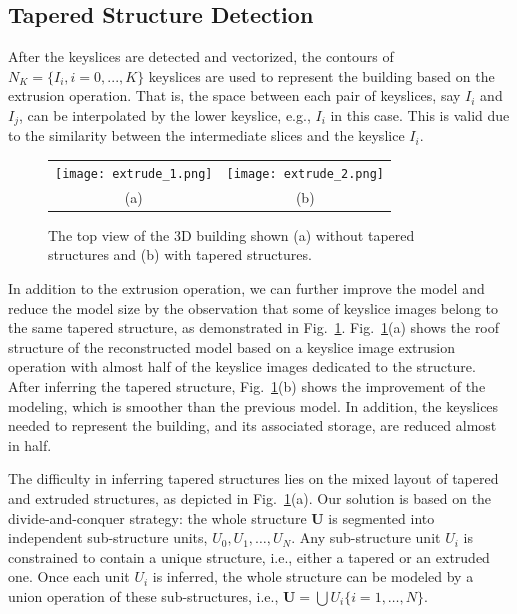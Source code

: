 \documentclass{article}
\newcommand{\Fig}[1]{Fig.~\ref{fig:#1}}
\newcommand{\Figa}[1]{Fig.~\ref{fig:#1}(a)}
\newcommand{\Figb}[1]{Fig.~\ref{fig:#1}(b)}
\begin{document}
\subsection{Tapered Structure Detection}
\label{sec:tsd}

After the keyslices are detected and vectorized, the contours of
$N_K = \{I_{i}, i = 0, ..., K \}$ keyslices are used to represent
the building based on the extrusion operation.
That is, the space between each pair of keyslices, say $I_{i}$ and $I_{j}$,
can be interpolated by the lower keyslice, e.g., $I_{i}$ in this case.
This is valid due to the similarity between the intermediate slices
and the keyslice $I_{i}$.

\begin{figure}[htbp]
\begin{center}
\begin{tabular}{cc}
\texttt{[image: extrude\_1.png]} &
\texttt{[image: extrude\_2.png]} \\
(a) & (b)
\end{tabular}
\end{center}
\caption{The top view of the 3D building shown (a) without tapered structures
and (b) with tapered structures.}
\label{fig:DXF_top}
\end{figure}

In addition to the extrusion operation, we can further improve the model
and reduce the model size by the observation that some of keyslice images
belong to the same tapered structure, as demonstrated in \Fig{DXF_top}.
\Figa{DXF_top} shows the roof structure
of the reconstructed model based on a keyslice image extrusion operation with
almost half of the keyslice images dedicated to the structure.
After inferring the tapered structure, \Figb{DXF_top} shows the improvement
of the modeling, which is smoother than the previous model.
In addition, the keyslices needed to represent the building, and its
associated storage, are reduced almost in half.

The difficulty in inferring tapered structures lies on the 
mixed layout of tapered and extruded structures, as depicted in \Figa{DXF_top}.
Our solution is based on the divide-and-conquer strategy:
the whole structure $\boldsymbol{U}$ is segmented into independent
sub-structure units, $U_0, U_1, \ldots, U_N$.
Any sub-structure unit $U_i$ is constrained to contain a unique structure,
i.e., either a tapered or an extruded one.
Once each unit $U_i$ is inferred, the whole structure can be modeled by a
union operation of these sub-structures, i.e.,
$\boldsymbol{U} = \bigcup{U_i\{ i = 1,\ldots,N\}}$.
\end{document}
